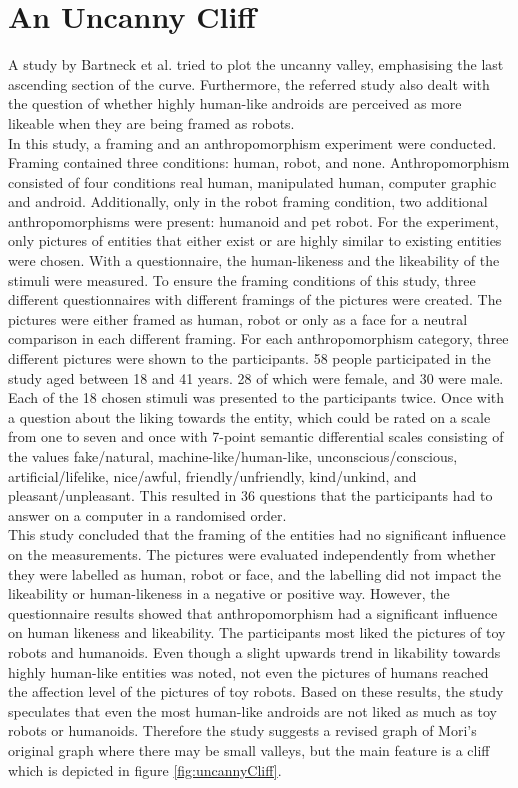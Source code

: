\section{An Uncanny Cliff}
A study by Bartneck et al. \cite{uncanny_cliff} tried to plot the uncanny valley, emphasising the last ascending section of the curve. Furthermore, the referred study also dealt with the question of whether highly human-like androids are perceived as more likeable when they are being framed as robots.\\
In this study, a framing and an anthropomorphism experiment were conducted. Framing contained three conditions: human, robot, and none. Anthropomorphism consisted of four conditions real human, manipulated human, computer graphic and android. Additionally, only in the robot framing condition, two additional anthropomorphisms were present: humanoid and pet robot. For the experiment, only pictures of entities that either exist or are highly similar to existing entities were chosen. 
With a questionnaire, the human-likeness and the likeability of the stimuli were measured.
To ensure the framing conditions of this study, three different questionnaires with different framings of the pictures were created. The pictures were either framed as human, robot or only as a face for a neutral comparison in each different framing. For each anthropomorphism category, three different pictures were shown to the participants. 
58 people participated in the study aged between 18 and 41 years. 28 of which were female, and 30 were male.
Each of the 18 chosen stimuli was presented to the participants twice. Once with a question about the liking towards the entity, which could be rated on a scale from one to seven and once with 7-point semantic differential scales consisting of the values fake/natural, machine-like/human-like, unconscious/conscious, artificial/lifelike, nice/awful, friendly/unfriendly, kind/unkind, and pleasant/unpleasant. This resulted in 36 questions that the participants had to answer on a computer in a randomised order.\\
This study concluded that the framing of the entities had no significant influence on the measurements. The pictures were evaluated independently from whether they were labelled as human, robot or face, and the labelling did not impact the likeability or human-likeness in a negative or positive way.
 However, the questionnaire results showed that anthropomorphism had a significant influence on human likeness and likeability. The participants most liked the pictures of toy robots and humanoids. Even though a slight upwards trend in likability towards highly human-like entities was noted, not even the pictures of humans reached the affection level of the pictures of toy robots. Based on these results, the study speculates that even the most human-like androids are not liked as much as toy robots or humanoids. Therefore the study suggests a revised graph of Mori's original graph where there may be small valleys, but the main feature is a cliff which is depicted in figure \ref{fig:uncannyCliff}.
